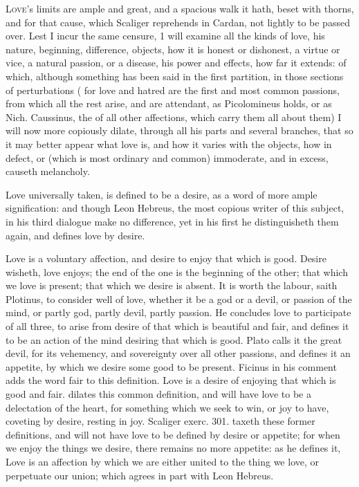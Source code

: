 {\lettrine{L}{ove}'s limits are ample and great, and a spacious walk it hath, beset
with thorns, and for that cause, which Scaliger reprehends in
Cardan, not lightly to be passed over. Lest I incur the same censure, 1
will examine all the kinds of love, his nature, beginning, difference,
objects, how it is honest or dishonest, a virtue or vice, a natural
passion, or a disease, his power and effects, how far it extends: of
which, although something has been said in the first partition, in
those sections of perturbations ( for love and hatred are the
first and most common passions, from which all the rest arise, and are
attendant, as Picolomineus holds, or as Nich. Caussinus, the  of all other affections, which carry them all about them) I will
now more copiously dilate, through all his parts and several branches,
that so it may better appear what love is, and how it varies with the
objects, how in defect, or (which is most ordinary and common)
immoderate, and in excess, causeth melancholy.

Love universally taken, is defined to be a desire, as a word of more
ample signification: and though Leon Hebreus, the most copious writer
of this subject, in his third dialogue make no difference, yet in his
first he distinguisheth them again, and defines love by desire.

Love is a voluntary affection, and desire to enjoy that which is
good. Desire wisheth, love enjoys; the end of the one is the
beginning of the other; that which we love is present; that which we
desire is absent. It is worth the labour, saith Plotinus, to
consider well of love, whether it be a god or a devil, or passion of
the mind, or partly god, partly devil, partly passion. He concludes
love to participate of all three, to arise from desire of that which is
beautiful and fair, and defines it to be an action of the mind desiring
that which is good. Plato calls it the great devil, for its
vehemency, and sovereignty over all other passions, and defines it an
appetite, by which we desire some good to be present. Ficinus in
his comment adds the word fair to this definition. Love is a desire of
enjoying that which is good and fair. \Austin{} dilates this common
definition, and will have love to be a delectation of the heart,
for something which we seek to win, or joy to have, coveting by
desire, resting in joy. Scaliger exerc. 301. taxeth these former
definitions, and will not have love to be defined by desire or
appetite; for when we enjoy the things we desire, there remains no more
appetite: as he defines it, Love is an affection by which we are either
united to the thing we love, or perpetuate our union; which agrees in
part with Leon Hebreus.

}
